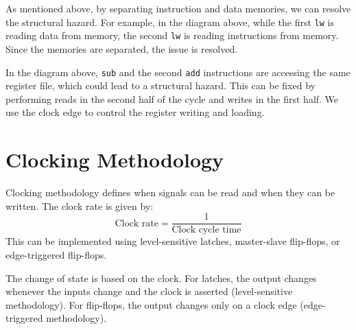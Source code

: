 As mentioned above, by separating instruction and data memories, we can resolve the structural hazard. For example, in the diagram above, while the first \verb|lw| is reading data from memory, the second \verb|lw| is reading instructions from memory. Since the memories are separated, the issue is resolved. 

In the diagram above, \verb|sub| and the second \verb|add| instructions are accessing the same register file, which could lead to a structural hazard. This can be fixed by performing reads in the second half of the cycle and writes in the first half. We use the clock edge to control the register writing and loading.

\section{Clocking Methodology}
Clocking methodology defines when signals can be read and when they can be written. The clock rate is given by:
\[
  \text{Clock rate} = \frac{1}{\text{Clock cycle time}}
\]
This can be implemented using level-sensitive latches, master-slave flip-flops, or edge-triggered flip-flops.

The change of state is based on the clock. For latches, the output changes whenever the inputs change and the clock is asserted (level-sensitive methodology). For flip-flops, the output changes only on a clock edge (edge-triggered methodology). 